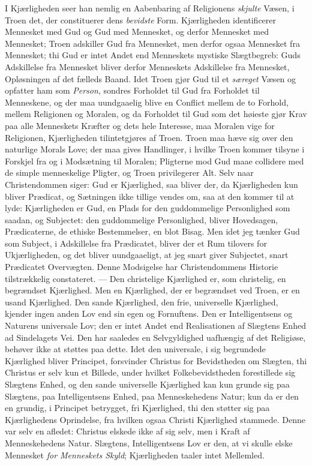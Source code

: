 I Kjærligheden seer han nemlig en Aabenbaring af Religionens \emph{skjulte}
Væsen, i Troen det, der constituerer dens \emph{bevidste} Form. Kjærligheden
identificerer Mennesket med Gud og Gud med Mennesket, og derfor Mennesket med
Mennesket; Troen adskiller Gud fra Mennesket, men derfor ogsaa Mennesket fra
Mennesket; thi Gud er intet Andet end Menneskets mystiske Slægtbegreb: Guds
Adskillelse fra Mennesket bliver derfor Menneskets Adskillelse fra Mennesket,
Opløsningen af det fælleds Baand. Idet Troen gjør Gud til et \emph{særeget} Væsen
og opfatter ham som \emph{Person}, sondres Forholdet til Gud fra Forholdet til
Menneskene, og der maa uundgaaelig blive en Conflict mellem de to Forhold,
mellem Religionen og Moralen, og da Forholdet til Gud som det høieste gjør Krav
paa alle Menneskets Kræfter og dets hele Interesse, maa Moralen vige for
Religionen, Kjærligheden tilintetgjøres af Troen. Troen maa hæve sig over den
naturlige Morals Love; der maa gives Handlinger, i hvilke Troen kommer tilsyne
i Forskjel fra og i Modsætning til Moralen; Pligterne mod Gud maae collidere
med de simple menneskelige Pligter, og Troen privilegerer Alt. Selv naar
Christendommen siger: Gud er Kjærlighed, saa bliver der, da Kjærligheden kun
bliver Prædicat, og Sætningen ikke tillige vendes om, saa at den kommer til at
lyde: Kjærligheden er Gud, en Plads for den guddommelige Personlighed som
saadan, og Subjectet: den guddommelige Personlighed, bliver Hovedsagen,
Prædicaterne, de ethiske Bestemmelser, en blot Bisag. Men idet jeg tænker Gud
som Subject, i Adskillelse fra Prædicatet, bliver der et Rum tilovers for
Ukjærligheden, og det bliver uundgaaeligt, at jeg snart giver Subjectet, snart
Prædicatet Overvægten. Denne Modsigelse har Christendommens Historie
tilstrækkelig constateret. --- Den christelige Kjærlighed er, som christelig, en
begrændset Kjærlighed. Men en Kjærlighed, der er begrændset ved Troen, er en
usand Kjærlighed. Den sande Kjærlighed, den frie, universelle Kjærlighed,
kjender ingen anden Lov end
 sin egen og Fornuftens. Den er Intelligentsens og Naturens universale Lov; den
er intet Andet end Realisationen af Slægtens Enhed ad Sindelagets Vei. Den har
saaledes en Selvgyldighed uafhængig af det Religiøse, behøver ikke at støttes
paa dette. Idet den universale, i sig begrundede Kjærlighed bliver Principet,
forsvinder Christus for Bevidstheden om Slægten, thi Christus er selv kun et
Billede, under hvilket Folkebevidstheden forestillede sig Slægtens Enhed, og
den sande universelle Kjærlighed kan kun grunde sig paa Slægtens, paa
Intelligentsens Enhed, paa Menneskehedens Natur; kun da er den en grundig, i
Principet betrygget, fri Kjærlighed, thi den støtter sig paa Kjærlighedens
Oprindelse, fra hvilken ogsaa Christi Kjærlighed stammede. Denne var selv en
afledet: Christus elskede ikke af sig selv, men i Kraft af Menneskehedens
Natur. Slægtens, Intelligentsens Lov er den, at vi skulle elske Mennesket
\emph{for Menneskets Skyld}; Kjærligheden taaler intet Mellemled.

